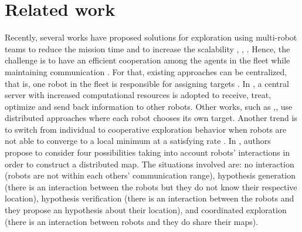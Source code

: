 \documentclass[11pt,openany]{book}
\begin{document}
\section{Related work}
Recently, several works have proposed solutions for exploration using multi-robot teams to reduce the mission time and to increase the scalability \cite{bautin2012strategie}, \cite{jensen2013rolling}, \cite{yan2014team}. Hence, the challenge is to have an eﬃcient cooperation among the agents in the ﬂeet while maintaining communication \cite{rooker2007multi}. For that, existing approaches can be centralized, that is, one robot in the ﬂeet is responsible for assigning targets \cite{burgard2000collaborative}. In \cite{schmuck2017multi}, a central server with increased computational resources is adopted to receive, treat, optimize and send back information to other robots. Other works, such as \cite{yuan2010cooperative},\cite{sheng2006distributed}, use distributed approaches where each robot chooses its own target. Another trend is to switch from individual to cooperative exploration behavior when robots are not able to converge to a local minimum at a satisfying rate \cite{wu2012robust}. In \cite{konolige2003map}, authors propose to consider four possibilities taking into account robots’ interactions in order to construct a distributed map. The situations involved are: no interaction (robots are not within each others’ communication range), hypothesis generation (there is an interaction between the robots but they do not know their respective location), hypothesis veriﬁcation (there is an interaction between the robots and they propose an hypothesis about their location), and coordinated exploration (there is an interaction between robots and they do share their maps).
\end{document}
